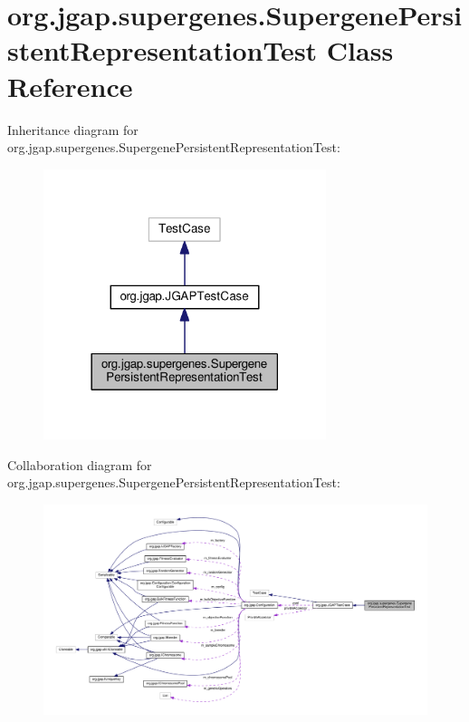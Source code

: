 \hypertarget{classorg_1_1jgap_1_1supergenes_1_1_supergene_persistent_representation_test}{\section{org.\-jgap.\-supergenes.\-Supergene\-Persistent\-Representation\-Test Class Reference}
\label{classorg_1_1jgap_1_1supergenes_1_1_supergene_persistent_representation_test}
}


Inheritance diagram for org.\-jgap.\-supergenes.\-Supergene\-Persistent\-Representation\-Test\-:
\nopagebreak
\begin{figure}[H]
\begin{center}
\leavevmode
\includegraphics[width=234pt]{classorg_1_1jgap_1_1supergenes_1_1_supergene_persistent_representation_test__inherit__graph}
\end{center}
\end{figure}


Collaboration diagram for org.\-jgap.\-supergenes.\-Supergene\-Persistent\-Representation\-Test\-:
\nopagebreak
\begin{figure}[H]
\begin{center}
\leavevmode
\includegraphics[width=350pt]{classorg_1_1jgap_1_1supergenes_1_1_supergene_persistent_representation_test__coll__graph}
\end{center}
\end{figure}
